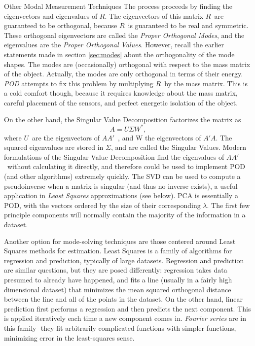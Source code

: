 \documentclass[a4paper,10pt]{report}
\numberwithin{equation}{section}
\begin{document}
{\begin{chapter}
\begin{section}{Other Modal Measurement Techniques}
The process proceeds by finding the eigenvectors and eigenvalues of $R$. The eigenvectors of this matrix $R$\  are guaranteed to be orthogonal, because $R$\  is guaranteed to be real and symmetric. These orthogonal eigenvectors are called the \emph{Proper Orthogonal Modes}, and the eigenvalues are the \emph{Proper Orthogonal Values}. However, recall the earlier statements made in section \ref{sec:modes} about the orthogonality of the mode shapes. The modes are (occasionally) orthogonal with respect to the mass matrix of the object. Actually, the modes are only orthogonal in terms of their energy. \cite{Cremer1973} \emph{POD} attempts to fix this problem by multiplying $R$\  by the mass matrix.\cite{Han2003} This is a cold comfort though, because it requires knowledge about the mass matrix, careful placement of the sensors, and perfect energetic isolation of the object. 
\par
On the other hand, the Singular Value Decomposition factorizes the matrix as
\begin{equation}
A = U\Sigma W^* , 
\end{equation}
where $U$\  are the eigenvectors of $A A'$\  , and W the eigenvectors of $A'A$. The squared eigenvalues are stored in $\Sigma$, and are called the Singular Values. Modern formulations of the Singular Value Decomposition find the eigenvalues of $A A'$\  without calculating it directly, and therefore could be used to implement POD (and other algorithms) extremely quickly. \cite[p.~368]{Watkins2010} The SVD can be used to compute a pseudoinverse when a matrix is singular (and thus no inverse exists), a useful application in \emph{Least Squares} approximations (see below). PCA is essentially a POD, with the vectors ordered by the size of their corresponding $\lambda$. The first few principle components will normally contain the majority of the information in a dataset. \cite[p.~4]{Fodor2002} 
\par
Another option for mode-solving techniques are those centered around Least Squares methods for estimation. Least Squares is a family of algorithms for regression and prediction, typically of large datasets. Regression and prediction are similar questions, but they are posed differently: regression takes data presumed to already have happened, and fits a line (usually in a fairly high dimensional dataset) that minimizes the mean squared orthogonal distance between the line and all of the points in the dataset. On the other hand, linear prediction first performs a regression and then predicts the next component. This is applied iteratively each time a new component comes in. \emph{Fourier series} are in this family- they fit arbitrarily complicated functions with simpler functions, minimizing error in the least-squares sense. \cite[p.~224]{Strang2009} 

\end{section}
\end{chapter}}
\end{document}
